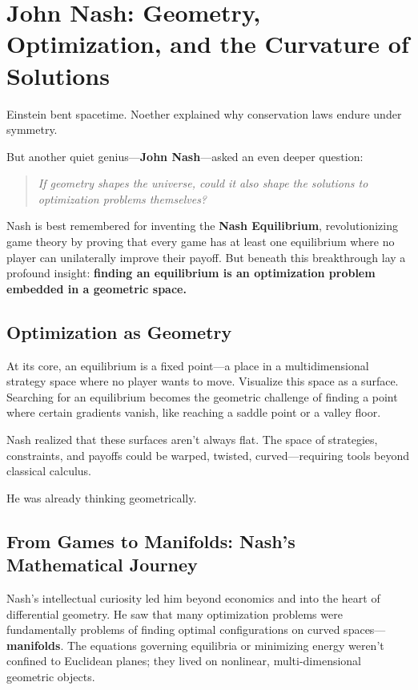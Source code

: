 \section{John Nash: Geometry, Optimization, and the Curvature of Solutions}

Einstein bent spacetime.  
Noether explained why conservation laws endure under symmetry.

But another quiet genius—\textbf{John Nash}—asked an even deeper question:

\begin{quote}
\textit{If geometry shapes the universe, could it also shape the solutions to optimization problems themselves?}
\end{quote}

Nash is best remembered for inventing the \textbf{Nash Equilibrium}, revolutionizing game theory by proving that every game has at least one equilibrium where no player can unilaterally improve their payoff. But beneath this breakthrough lay a profound insight:  
\textbf{finding an equilibrium is an optimization problem embedded in a geometric space.}

\subsection{Optimization as Geometry}

At its core, an equilibrium is a fixed point—a place in a multidimensional strategy space where no player wants to move. Visualize this space as a surface. Searching for an equilibrium becomes the geometric challenge of finding a point where certain gradients vanish, like reaching a saddle point or a valley floor.

Nash realized that these surfaces aren’t always flat. The space of strategies, constraints, and payoffs could be warped, twisted, curved—requiring tools beyond classical calculus.

He was already thinking geometrically.

\subsection{From Games to Manifolds: Nash’s Mathematical Journey}

Nash’s intellectual curiosity led him beyond economics and into the heart of differential geometry. He saw that many optimization problems were fundamentally problems of finding optimal configurations on curved spaces—\textbf{manifolds}. The equations governing equilibria or minimizing energy weren’t confined to Euclidean planes; they lived on nonlinear, multi-dimensional geometric objects.

